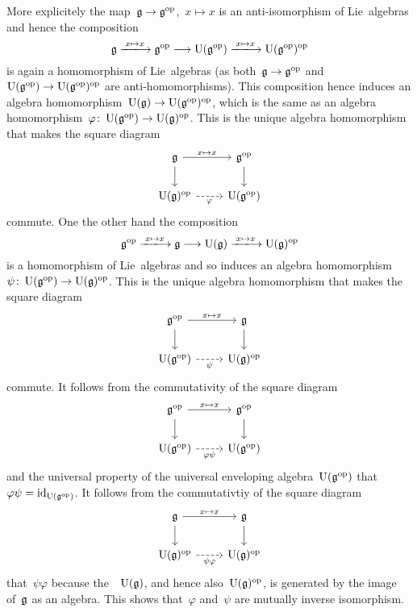 \begin{example}
  More explicitely the map~$\mathfrak{g} \to \mathfrak{g}^{\mathrm{op}}$,~$x \mapsto x$ is an anti-isomorphism of Lie~algebras and hence the composition
  \[
    \glie
    \xlongto{x \mapsto x}
    \glie^{\op}
    \longto
    \Univ(\glie^{\op})
    \xlongto{x \mapsto x}
    \Univ(\glie^{\op})^{\op}
  \]
  is again a homomorphism of Lie~algebras (as both~$\mathfrak{g} \to \mathfrak{g}^{\mathrm{op}}$ and~$\operatorname{U}(\mathfrak{g}^{\mathrm{op}}) \to \operatorname{U}(\mathfrak{g}^{\mathrm{op}})^{\mathrm{op}}$ are anti-homomorphisms).
  This composition hence induces an algebra homomorphism~$\operatorname{U}(\mathfrak{g}) \to \operatorname{U}(\mathfrak{g}^{\mathrm{op}})^{\mathrm{op}}$, which is the same as an algebra homomorphism~$\varphi \colon \operatorname{U}(\mathfrak{g}^{\mathrm{op}}) \to \operatorname{U}(\mathfrak{g})^{\mathrm{op}}$.
  This is the unique algebra homomorphism that makes the square diagram
  \[
    \begin{tikzcd}
      \glie
      \arrow{r}[above]{x \mapsto x}
      \arrow{d}
      &
      \glie^{\op}
      \arrow{d}
      \\
      \Univ(\glie)^{\op}
      \arrow[dashed]{r}[below]{\varphi}
      &
      \Univ(\glie^{\op})
    \end{tikzcd}
  \]
  commute.
  One the other hand the composition
  \[
    \glie^{\op}
    \xlongto{x \mapsto x}
    \glie
    \longto
    \Univ(\glie)
    \xlongto{x \mapsto x}
    \Univ(\glie)^{\op}
  \]
  is a homomorphism of Lie~algebras and so induces an algebra homomorphism~$\psi \colon \operatorname{U}(\mathfrak{g}^{\mathrm{op}}) \to \operatorname{U}(\mathfrak{g})^{\mathrm{op}}$.
  This is the unique algebra homomorphism that makes the square diagram
  \[
    \begin{tikzcd}
      \glie^{\op}
      \arrow{r}[above]{x \mapsto x}
      \arrow{d}
      &
      \glie
      \arrow{d}
      \\
      \Univ(\glie^{\op})
      \arrow[dashed]{r}[below]{\psi}
      &
      \Univ(\glie)^{\op}
    \end{tikzcd}
  \]
  commute.
  It follows from the commutativity of the square diagram
  \[
    \begin{tikzcd}
      \glie^{\op}
      \arrow{r}[above]{x \mapsto x}
      \arrow{d}
      &
      \glie^{\op}
      \arrow{d}
      \\
      \Univ(\glie^{\op})
      \arrow[dashed]{r}[below]{\varphi \psi}
      &
      \Univ(\glie^{\op})
    \end{tikzcd}
  \]
  and the universal property of the universal enveloping algebra~$\operatorname{U}(\mathfrak{g}^{\mathrm{op}})$ that~$\varphi \psi = \operatorname{id}_{\operatorname{U}(\mathfrak{g}^{\mathrm{op}})}$.
  It follows from the commutativtiy of the square diagram
  \[
    \begin{tikzcd}
      \glie
      \arrow{r}[above]{x \mapsto x}
      \arrow{d}
      &
      \glie
      \arrow{d}
      \\
      \Univ(\glie)^{\op}
      \arrow[dashed]{r}[below]{\psi \varphi}
      &
      \Univ(\glie)^{\op}
    \end{tikzcd}
  \]
  that~$\psi \varphi$ because the~{\algebra{$\kf$}}~$\operatorname{U}(\mathfrak{g})$, and hence also~$\operatorname{U}(\mathfrak{g})^{\mathrm{op}}$, is generated by the image of~$\mathfrak{g}$ as an algebra.
  This shows that~$\varphi$ and~$\psi$ are mutually inverse isomorphism.
  

\end{example}
